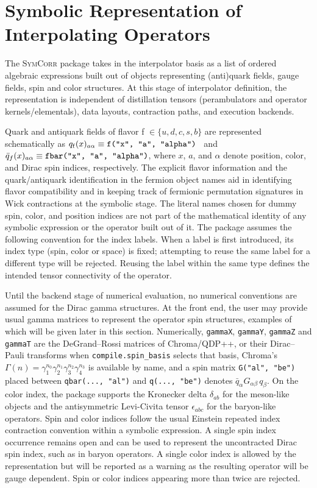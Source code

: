 \documentclass[a4paper,fleqn]{cas-dc}
\newcommand{\add}[1]{{\color{blue}#1}}
\begin{document}
\section{Symbolic Representation of Interpolating Operators}
\label{sec:symbolic}

The \textsc{SymCorr} package takes in the interpolator basis as a list of ordered algebraic expressions built out of objects representing (anti)quark fields, gauge fields, spin and color structures. At this stage of interpolator definition, the representation is independent of distillation tensors (perambulators and operator kernels/elementals), data layouts, contraction paths, and execution backends. 

Quark and antiquark fields of flavor f $\in\{u,d,c,s,b\}$ are represented schematically as $q_{\rm f}(x)_{a\alpha}\equiv\mbox{\texttt{f("x", "a", "alpha")}}$ ~and $\bar q_f(x)_{a\alpha}\equiv \mbox{\texttt{fbar("x", "a", "alpha")}}$, where $x$, $a$, and $\alpha$ denote position, color, and Dirac spin indices, respectively. The explicit flavor information and the quark/antiquark identification in the fermion object names aid in identifying flavor compatibility and in keeping track of fermionic permutation signatures in Wick contractions at the symbolic stage. The literal names chosen for dummy spin, color, and position indices are not part of the mathematical identity of any symbolic expression or the operator built out of it. The package assumes the following convention for the index labels. When a label is first introduced, its index type (spin, color or space) is fixed; attempting to reuse the same label for a different type will be rejected. Reusing the label within the same type defines the intended tensor connectivity of the operator.

Until the backend stage of numerical evaluation, no numerical conventions are assumed for the Dirac gamma structures. At the front end, the user may provide usual gamma matrices to represent the operator spin structures, examples of which will be given later in this section. \add{Numerically, \texttt{gammaX}, \texttt{gammaY}, \texttt{gammaZ} and \texttt{gammaT} are the DeGrand--Rossi matrices of Chroma/QDP++, or their Dirac--Pauli transforms when \texttt{compile.spin\_basis} selects that basis, Chroma's $\Gamma(n)=\gamma_1^{n_0}\gamma_2^{n_1}\gamma_3^{n_2}\gamma_4^{n_3}$ is available by name, and a spin matrix \texttt{G("al", "be")} placed between \texttt{qbar(..., "al")} and \texttt{q(..., "be")} denotes $\bar q_\alpha G_{\alpha\beta}\,q_\beta$.} On the color index, the package supports the Kronecker delta $\delta_{ab}$ for the meson-like objects and the antisymmetric Levi-Civita tensor $\epsilon_{abc}$ for the baryon-like operators. Spin and color indices follow the usual Einstein repeated index contraction convention within a symbolic expression. A single spin index occurrence remains open and can be used to represent the uncontracted Dirac spin index, such as in baryon operators. A single color index is allowed by the representation but will be reported as a warning as the resulting operator will be gauge dependent. Spin or color indices appearing more than twice are rejected.
\end{document}
